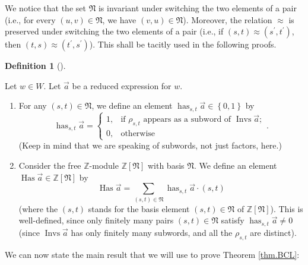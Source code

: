 \documentclass[numbers=enddot,12pt,final,onecolumn,notitlepage,abstracton]{scrartcl}%
\theoremstyle{definition}
\newtheorem{defi}[theo]{Definition}
\newenvironment{definition}[1][]
{\begin{defi}[#1]\begin{leftbar}}
{\end{leftbar}\end{defi}}
\let\sumnonlimits\sum
\renewcommand{\sum}{\sumnonlimits\limits}
\begin{document}
We notice that the set $\mathfrak{N}$ is invariant under switching the two
elements of a pair (i.e., for every $\left(  u,v\right)  \in\mathfrak{N}$, we
have $\left(  v,u\right)  \in\mathfrak{N}$). Moreover, the relation $\approx$
is preserved under switching the two elements of a pair (i.e., if $\left(
s,t\right)  \approx\left(  s^{\prime},t^{\prime}\right)  $, then $\left(
t,s\right)  \approx\left(  t^{\prime},s^{\prime}\right)  $). This shall be
tacitly used in the following proofs.

\begin{definition}
\label{def.has}Let $w\in W$. Let $\overrightarrow{a}$ be a reduced expression
for $w$.

\begin{enumerate}
\item[\textbf{(a)}] For any $\left(  s,t\right)  \in\mathfrak{N}$, we define
an element $\operatorname*{has}\nolimits_{s,t}\overrightarrow{a}\in\left\{
0,1\right\}  $ by%
\[
\operatorname*{has}\nolimits_{s,t}\overrightarrow{a}=%
\begin{cases}
1, & \text{if }\rho_{s,t}\text{ appears as a subword of }\operatorname*{Invs}%
\overrightarrow{a};\\
0, & \text{otherwise}%
\end{cases}
.
\]
(Keep in mind that we are speaking of subwords, not just factors, here.)

\item[\textbf{(b)}] Consider the free $\mathbb{Z}$-module $\mathbb{Z}\left[
\mathfrak{N}\right]  $ with basis $\mathfrak{N}$. We define an element
$\operatorname*{Has}\overrightarrow{a}\in\mathbb{Z}\left[  \mathfrak{N}%
\right]  $ by%
\[
\operatorname*{Has}\overrightarrow{a}=\sum_{\left(  s,t\right)  \in
\mathfrak{N}}\operatorname*{has}\nolimits_{s,t}\overrightarrow{a}\cdot\left(
s,t\right)
\]
(where the $\left(  s,t\right)  $ stands for the basis element $\left(
s,t\right)  \in\mathfrak{N}$ of $\mathbb{Z}\left[  \mathfrak{N}\right]  $).
This is well-defined, since only finitely many pairs $\left(  s,t\right)
\in\mathfrak{N}$ satisfy $\operatorname*{has}\nolimits_{s,t}\overrightarrow{a}%
\neq0$ (since $\operatorname*{Invs}\overrightarrow{a}$ has only finitely many
subwords, and all the $\rho_{s,t}$ are distinct).
\end{enumerate}
\end{definition}

We can now state the main result that we will use to prove Theorem
\ref{thm.BCL}:
\end{document}
